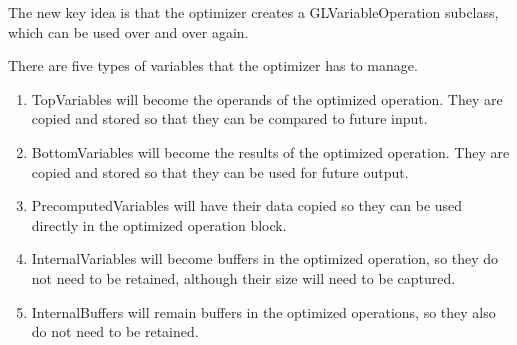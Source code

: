 \documentclass[11pt]{article}
\begin{document}
The new key idea is that the optimizer creates a GLVariableOperation subclass, which can be used over and over again.

There are five types of variables that the optimizer has to manage.
\begin{enumerate}
\item TopVariables will become the operands of the optimized operation. They are copied and stored so that they can be compared to future input.
\item BottomVariables will become the results of the optimized operation. They are copied and stored so that they can be used for future output.
\item PrecomputedVariables will have their data copied so they can be used directly in the optimized operation block.
\item InternalVariables will become buffers in the optimized operation, so they do not need to be retained, although their size will need to be captured.
\item InternalBuffers will remain buffers in the optimized operations, so they also do not need to be retained.
\end{enumerate}
\end{document}
